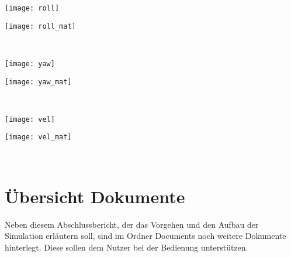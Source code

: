 %
%
\begin{minipage}{0.49\linewidth} 	
	\texttt{[image: roll]}
\end{minipage}
\begin{minipage}{0.01\linewidth}
	\hfill
\end{minipage}
\begin{minipage}{0.49\linewidth}
	\texttt{[image: roll\_mat]}
\end{minipage}
\noindent\\
%
%
\begin{minipage}{0.49\linewidth} 	
	\texttt{[image: yaw]}
\end{minipage}
\begin{minipage}{0.01\linewidth}
	\hfill
\end{minipage}
\begin{minipage}{0.49\linewidth}
	\texttt{[image: yaw\_mat]}
\end{minipage}
\noindent\\
%
%
\begin{minipage}{0.49\linewidth} 	
	\texttt{[image: vel]}
\end{minipage}
\begin{minipage}{0.01\linewidth}
	\hfill
\end{minipage}
\begin{minipage}{0.49\linewidth}
	\texttt{[image: vel\_mat]}
\end{minipage}
\noindent\\

\section{Übersicht Dokumente}
Neben diesem Abschlussbericht, der das Vorgehen und den Aufbau der Simulation erläutern soll, sind im Ordner Documents noch weitere Dokumente hinterlegt. Diese sollen dem Nutzer bei der Bedienung unterstützen.\\
